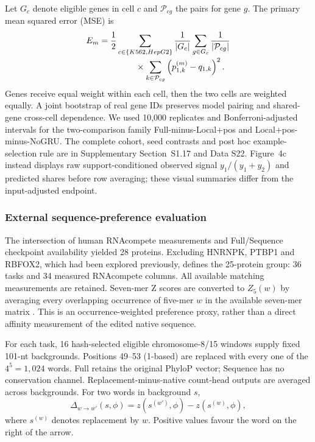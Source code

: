 \documentclass[webpdf,contemporary,large]{oup-authoring-template}
\newcommand{\supsect}[1]{Supplementary Section~#1}
\begin{document}
Let $G_c$ denote eligible genes in cell $c$ and $\mathcal P_{cg}$ the pairs for gene $g$. The primary mean squared error (MSE) is
\begin{equation}
\begin{aligned}
E_m&=\frac12\sum_{c\in\{K562,HepG2\}}\frac1{|G_c|}
\sum_{g\in G_c}\frac1{|\mathcal P_{cg}|}\\[-2pt]
&\hspace{15mm}\times\sum_{k\in\mathcal P_{cg}}
\left(p_{1,k}^{(m)}-q_{1,k}\right)^2 .
\end{aligned}
\label{eq:allocation_estimator}
\end{equation}
Genes receive equal weight within each cell, then the two cells are weighted equally. A joint bootstrap of real gene IDs preserves model pairing and shared-gene cross-cell dependence. We used 10,000 replicates and Bonferroni-adjusted intervals for the two-comparison family Full-minus-Local+pos and Local+pos-minus-NoGRU. The complete cohort, seed contrasts and post hoc example-selection rule are in \supsect{S1.17} and Data S22. Figure~4c instead displays raw support-conditioned observed signal $y_1/(y_1+y_2)$ and predicted shares before row averaging; these visual summaries differ from the input-adjusted endpoint.

\subsubsection{External sequence-preference evaluation}\label{subsec:order_methods}

The intersection of human RNAcompete measurements and Full/Sequence checkpoint availability yielded 28 proteins. Excluding HNRNPK, PTBP1 and RBFOX2, which had been explored previously, defines the 25-protein group: 36 tasks and 34 measured RNAcompete columns. All available matching measurements are retained. Seven-mer Z scores are converted to $Z_5(w)$ by averaging every overlapping occurrence of five-mer $w$ in the available seven-mer matrix \citep{ray2013compendium}. This is an occurrence-weighted preference proxy, rather than a direct affinity measurement of the edited native sequence.

For each task, 16 hash-selected eligible chromosome-8/15 windows supply fixed 101-nt backgrounds. Positions 49--53 (1-based) are replaced with every one of the $4^5=1,024$ words. Full retains the original PhyloP vector; Sequence has no conservation channel. Replacement-minus-native count-head outputs are averaged across backgrounds. For two words in background $s$,
\begin{equation}
\Delta_{w\to w'}(s,\phi)
=z(s^{(w')},\phi)-z(s^{(w)},\phi),
\label{eq:word_response}
\end{equation}
where $s^{(w)}$ denotes replacement by $w$. Positive values favour the word on the right of the arrow.
\end{document}
